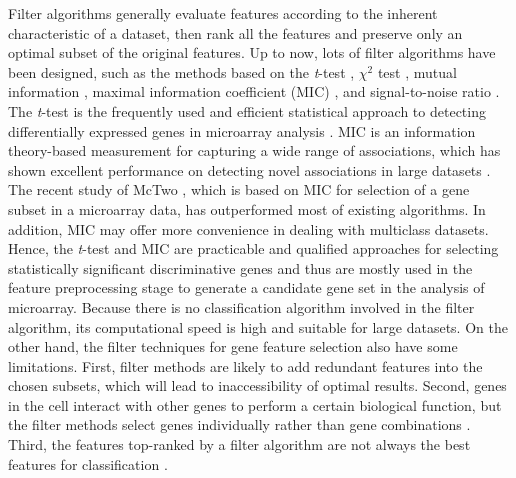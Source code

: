 \documentclass[10pt,journal,compsoc]{IEEEtran}
\begin{document}
	Filter algorithms generally evaluate features according to the inherent characteristic of a dataset, then rank all the features and preserve only an optimal subset of the original features. Up to now, lots of filter algorithms have been designed, such as the methods based on the \textit{t}-test \cite{W23}, $\chi^2$ test \cite{W21}, mutual information \cite{W22}, maximal information coefficient (MIC) \cite{W25}, and signal-to-noise ratio \cite{W24}. The \textit{t}-test is the frequently used and efficient statistical approach to detecting differentially expressed genes in microarray analysis \cite{RN413, RN414, RN421, RN417, RN418, RN419, RN416}. MIC is an information theory-based measurement for capturing a wide range of associations, which has shown excellent performance on detecting novel associations in large datasets \cite{W8}. The recent study of McTwo \cite{W16}, which is based on MIC for selection of a gene subset in a microarray data, has outperformed most of existing algorithms. In addition, MIC may offer more convenience in dealing with multiclass datasets. Hence, the \textit{t}-test and MIC are practicable and qualified approaches for selecting statistically significant discriminative genes and thus are mostly used in the feature preprocessing stage to generate a candidate gene set in the analysis of microarray. Because there is no classification algorithm involved in the filter algorithm, its computational speed is high and suitable for large datasets. On the other hand, the filter techniques for gene feature selection also have some limitations. First, filter methods are likely to add redundant features into the chosen subsets, which will lead to inaccessibility of optimal results. Second, genes in the cell interact with other genes to perform a certain biological function, but the filter methods select genes individually rather than gene combinations \cite{P34}. Third, the features top-ranked by a filter algorithm are not always the best features for classification \cite{W16}.
	
\end{document}

